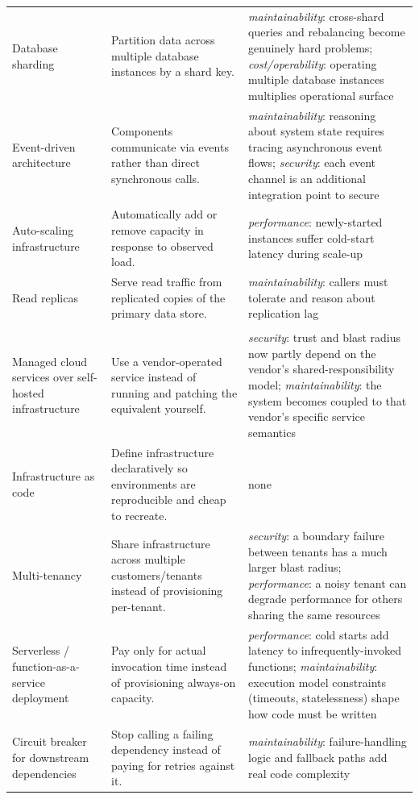 \documentclass[preprint,12pt,authoryear]{elsarticle}
\renewcommand{\_}{\textunderscore\allowbreak{}}
\begin{document}
{\begin{longtable}{@{}>{\raggedright\arraybackslash}p{1.35in}>{\raggedright\arraybackslash}p{1.65in}>{\raggedright\arraybackslash}p{2.22in}@{}}
Database sharding & Partition data across multiple database instances by a shard key. & \emph{maintainability}: cross-shard queries and rebalancing become genuinely hard problems; \emph{cost/operability}: operating multiple database instances multiplies operational surface \\
Event-driven architecture & Components communicate via events rather than direct synchronous calls. & \emph{maintainability}: reasoning about system state requires tracing asynchronous event flows; \emph{security}: each event channel is an additional integration point to secure \\
Auto-scaling infrastructure & Automatically add or remove capacity in response to observed load. & \emph{performance}: newly-started instances suffer cold-start latency during scale-up \\
Read replicas & Serve read traffic from replicated copies of the primary data store. & \emph{maintainability}: callers must tolerate and reason about replication lag \\
\midrule
\multicolumn{3}{@{}l}{\textbf{Cost/operability}} \\
\midrule
Managed cloud services over self-hosted infrastructure & Use a vendor-operated service instead of running and patching the equivalent yourself. & \emph{security}: trust and blast radius now partly depend on the vendor's shared-responsibility model; \emph{maintainability}: the system becomes coupled to that vendor's specific service semantics \\
Infrastructure as code & Define infrastructure declaratively so environments are reproducible and cheap to recreate. & none \\
Multi-tenancy & Share infrastructure across multiple customers/tenants instead of provisioning per-tenant. & \emph{security}: a boundary failure between tenants has a much larger blast radius; \emph{performance}: a noisy tenant can degrade performance for others sharing the same resources \\
Serverless / function-as-a-service deployment & Pay only for actual invocation time instead of provisioning always-on capacity. & \emph{performance}: cold starts add latency to infrequently-invoked functions; \emph{maintainability}: execution model constraints (timeouts, statelessness) shape how code must be written \\
Circuit breaker for downstream dependencies & Stop calling a failing dependency instead of paying for retries against it. & \emph{maintainability}: failure-handling logic and fallback paths add real code complexity \\
\end{longtable}
}
\end{document}
